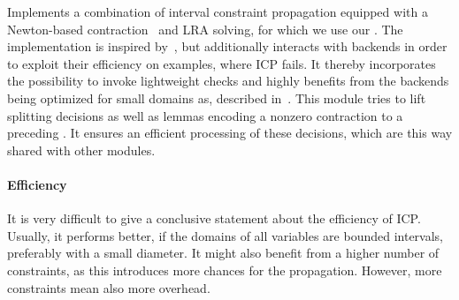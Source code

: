 Implements a combination of interval constraint propagation equipped with a Newton-based contraction~\cite{CompNewtonHR} and LRA solving, for which we use our \lraModuleClass. The implementation is inspired by~\cite{GGIGSC10}, but additionally interacts with backends in order to exploit their efficiency on examples, where ICP fails. It thereby incorporates the possibility to invoke lightweight checks and highly benefits from the backends being optimized for small domains as,  \eg described in~\cite{Article_Loup_TubeCAD}. This module tries to lift splitting decisions as well as lemmas encoding a nonzero contraction to a preceding \satModuleClass. It ensures an efficient processing of these decisions, which are this way shared with other modules.

\paragraph{Efficiency} It is very difficult to give a conclusive statement about the efficiency of ICP. Usually, it performs better, if the domains of all variables are bounded intervals, preferably with a small diameter. It might also benefit from a higher number of constraints, as this introduces more chances for the propagation. However, more constraints mean also more overhead.